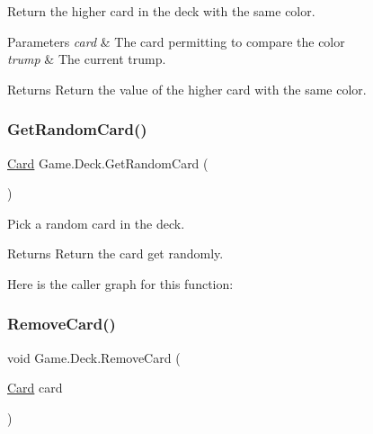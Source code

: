 Return the higher card in the deck with the same color. 
\begin{DoxyParams}{Parameters}
{\em card} & The card permitting to compare the color \\
\hline
{\em trump} & The current trump. \\
\hline
\end{DoxyParams}
\begin{DoxyReturn}{Returns}
Return the value of the higher card with the same color. 
\end{DoxyReturn}
\mbox{\label{class_game_1_1_deck_a7178873941924addbde9c150bb253c5b}} 
\subsubsection{\texorpdfstring{Get\+Random\+Card()}{GetRandomCard()}}
{\footnotesize\ttfamily \hyperlink{class_game_1_1_card}{Card} Game.\+Deck.\+Get\+Random\+Card (\begin{DoxyParamCaption}{ }\end{DoxyParamCaption})\hspace{0.3cm}{\ttfamily [inline]}}

Pick a random card in the deck. \begin{DoxyReturn}{Returns}
Return the card get randomly. 
\end{DoxyReturn}
Here is the caller graph for this function\+:
\mbox{\label{class_game_1_1_deck_ad860d1e5b25771143334ac5abf6a82ab}} 
\subsubsection{\texorpdfstring{Remove\+Card()}{RemoveCard()}\hspace{0.1cm}{\footnotesize\ttfamily [1/2]}}
{\footnotesize\ttfamily void Game.\+Deck.\+Remove\+Card (\begin{DoxyParamCaption}\item[{\hyperlink{class_game_1_1_card}{Card}}]{card }\end{DoxyParamCaption})\hspace{0.3cm}{\ttfamily [inline]}}

